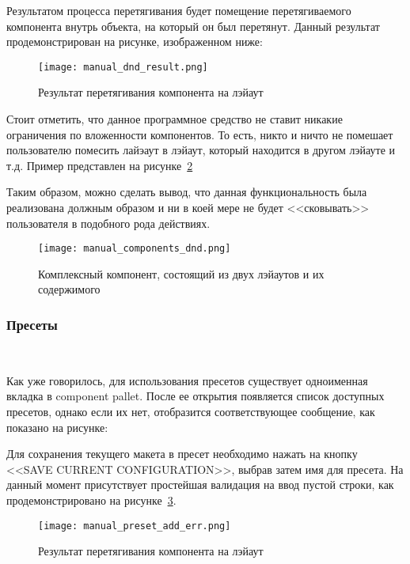 Результатом процесса перетягивания будет помещение перетягиваемого компонента внутрь объекта, на который он был перетянут. Данный результат продемонстрирован на рисунке, изображенном ниже:

\begin{figure}[ht]
  \centering
    \texttt{[image: manual\_dnd\_result.png]}
    \caption{Результат перетягивания компонента на лэйаут}
    \label{sec:manual:manual_dnd_result}
\end{figure}

Стоит отметить, что данное программное средство не ставит никакие ограничения по вложенности компонентов. То есть, никто и ничто не помешает пользователю помесить лайэаут в лэйаут, который находится в другом лэйауте и т.д. Пример представлен на рисунке~\ref{sec:manual:manual_components_dnd}

Таким образом, можно сделать вывод, что данная функциональность была реализована должным образом и ни в коей мере не будет <<сковывать>> пользователя в подобного рода действиях.

\begin{figure}[ht]
  \centering
    \texttt{[image: manual\_components\_dnd.png]}
    \caption{Комплексный компонент, состоящий из двух лэйаутов и их содержимого}
    \label{sec:manual:manual_components_dnd}
\end{figure}

\subsubsection{Пресеты}
\

Как уже говорилось, для использования пресетов существует одноименная вкладка в component pallet. После ее открытия появляется список доступных пресетов, однако если их нет, отобразится соответствующее сообщение, как показано на рисунке:


Для сохранения текущего макета в пресет необходимо нажать на кнопку <<SAVE CURRENT CONFIGURATION>>, выбрав затем имя для пресета. На данный момент присутствует простейшая валидация на ввод пустой строки, как продемонстрировано на рисунке~\ref{sec:manual:manual_preset_add_err}.

\begin{figure}[ht]
  \centering
    \texttt{[image: manual\_preset\_add\_err.png]}
    \caption{Результат перетягивания компонента на лэйаут}
    \label{sec:manual:manual_preset_add_err}
\end{figure}

